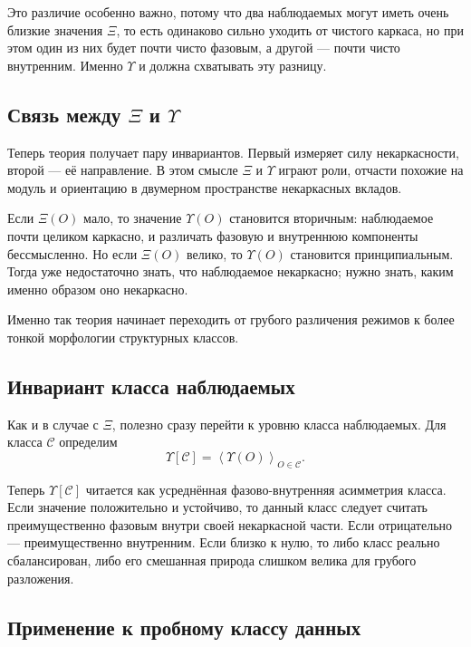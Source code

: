 \documentclass[12pt,a4paper]{article}
\begin{document}
Это различие особенно важно, потому что два наблюдаемых могут иметь очень близкие значения \(\Xi\), то есть одинаково сильно уходить от чистого каркаса, но при этом один из них будет почти чисто фазовым, а другой --- почти чисто внутренним. Именно \(\Upsilon\) и должна схватывать эту разницу.

\subsection{Связь между \texorpdfstring{$\Xi$}{Xi} и \texorpdfstring{$\Upsilon$}{Upsilon}}

Теперь теория получает пару инвариантов. Первый измеряет силу некаркасности, второй --- её направление. В этом смысле \(\Xi\) и \(\Upsilon\) играют роли, отчасти похожие на модуль и ориентацию в двумерном пространстве некаркасных вкладов.

Если \(\Xi(O)\) мало, то значение \(\Upsilon(O)\) становится вторичным: наблюдаемое почти целиком каркасно, и различать фазовую и внутреннюю компоненты бессмысленно. Но если \(\Xi(O)\) велико, то \(\Upsilon(O)\) становится принципиальным. Тогда уже недостаточно знать, что наблюдаемое некаркасно; нужно знать, каким именно образом оно некаркасно.

Именно так теория начинает переходить от грубого различения режимов к более тонкой морфологии структурных классов.

\subsection{Инвариант класса наблюдаемых}

Как и в случае с \(\Xi\), полезно сразу перейти к уровню класса наблюдаемых. Для класса \(\mathcal{C}\) определим
\begin{equation}
\Upsilon[\mathcal{C}] = \left\langle \Upsilon(O) \right\rangle_{O \in \mathcal{C}}.
\end{equation}

Теперь \(\Upsilon[\mathcal{C}]\) читается как усреднённая фазово-внутренняя асимметрия класса. Если значение положительно и устойчиво, то данный класс следует считать преимущественно фазовым внутри своей некаркасной части. Если отрицательно --- преимущественно внутренним. Если близко к нулю, то либо класс реально сбалансирован, либо его смешанная природа слишком велика для грубого разложения.

\subsection{Применение к пробному классу данных}
\end{document}
